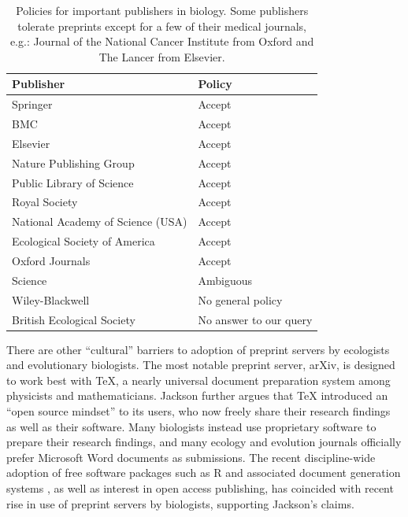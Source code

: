 \documentclass[letterpaper,twocolumn,superscriptaddress,showkeys]{revtex4}
\begin{document}
\begin{table}
    \centering
    \begin{tabular}{|ll|}
    \hline
    Publisher                                   & Policy \\
    \hline
    Springer                            	& Accept \\
    BMC                                 	& Accept \\
    Elsevier                            	& Accept \\
    Nature Publishing Group             	& Accept \\
    Public Library of Science           	& Accept \\
    Royal Society                       	& Accept \\
    National Academy of Science (USA)           & Accept \\
    Ecological Society of America       	& Accept \\
    Oxford Journals                             & Accept \\
    Science                             	& Ambiguous \\
    Wiley-Blackwell                       	& No general policy \\
    British Ecological Society                  & No answer to our query \\
    \hline
    \end{tabular}
    \caption{Policies for important publishers in biology. Some publishers
tolerate preprints except for a few of their medical journals, e.g.: Journal
of the National Cancer Institute from Oxford and The Lancer from Elsevier.}
    \label{table:policies}
\end{table}

There are other ``cultural'' barriers to adoption of preprint servers by
ecologists and evolutionary biologists.  The most notable preprint server,
arXiv, is designed to work best with \TeX{}, a nearly universal document
preparation system among physicists and mathematicians.  Jackson
\cite{jackson2002preprints} further argues that \TeX{} introduced an ``open
source mindset'' to its users, who now freely share their research findings as
well as their software.  Many biologists instead use proprietary software to
prepare their research findings, and many ecology and evolution journals
officially prefer Microsoft Word documents as submissions.  The recent
discipline-wide adoption of free software packages such as R and associated
document generation systems \cite{xie2012}, as well as interest in open access
publishing, has coincided with recent rise in use of preprint servers by
biologists, supporting Jackson's claims. \cite{xie12}
\end{document}
